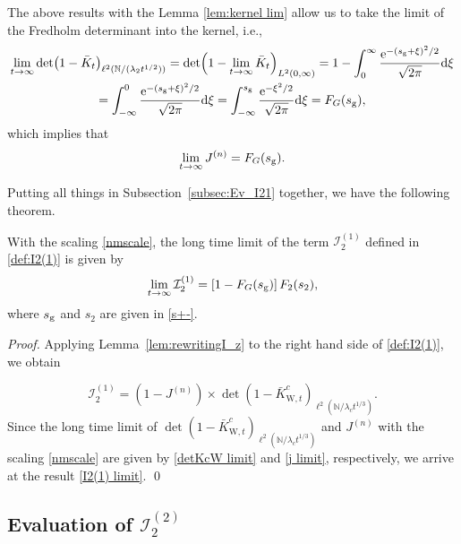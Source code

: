 \documentclass[cmp]{svjour}
\numberwithin{theorem}{section}
\numberwithin{equation}{section}
\DeclareMathOperator{\e}{e}
\def\dd{{\rm d}}
\begin{document}
The above results with the Lemma \ref{lem:kernel lim} allow us to take the limit of the Fredholm determinant into the kernel, i.e.,
\begin{multline*}
\lim_{t\rightarrow\infty}\det(1-\bar{K}_t)_{\ell^2(\mathbb{N}/(\lambda_2 t^{1/2}))}
=\det(1-\lim_{t\rightarrow\infty} \bar{K}_t)_{L^2(0,\infty)}
=1-\int_{0}^{\infty}\frac{\e^{-(s_{\rm g}+\xi)^2/2}}{\sqrt{2\pi}}\dd \xi\\=
\int^{0}_{-\infty}\frac{\e^{-(s_{\rm g}+\xi)^2/2}}{\sqrt{2\pi}}\dd \xi
=
\int^{s_{\rm g}}_{-\infty}\frac{\e^{-\xi^2/2}}{\sqrt{2\pi}}\dd \xi
=F_G(s_{\rm g}),
\end{multline*}
which implies that
\begin{equation}\label{j limit}
\lim_{t\rightarrow \infty} J^{(n)} =F_G(s_{\rm g}) .
\end{equation}

Putting all things in Subsection~\ref{subsec:Ev_I21} together, we have the following theorem.

\begin{theorem}
\label{thm_I2(1) limit}
With the scaling  \eqref{nmscale}, the long time limit of the term $\mathcal{I}^{(1)}_2$ defined in \eqref{def:I2(1)} is given by 
\begin{equation}
\label{I2(1) limit}
\lim_{t\rightarrow\infty}\mathcal{I}^{(1)}_2 = \left[ 1 - F_G(s_{\rm g}) \right] F_2(s_2),
\end{equation}
where $s_{\rm g}$ and $s_{2}$ are given in \eqref{s+-}.

\end{theorem}

\begin{proof}
Applying Lemma~\ref{lem:rewritingI_z} to the right hand side of \eqref{def:I2(1)}, we obtain

\begin{equation*}
    \mathcal{I}^{(1)}_2 = (1 - J^{(n)}) \times \det(1 - \bar{K}^c_{\mathrm{W},t})_{\ell^2(\mathbb{N}/\lambda_c t^{1/3})}.
\end{equation*}
Since the long time limit of $\det(1-\bar{K}^c_{\mathrm{W},t})_{\ell^2(\mathbb{N}/\lambda_c t^{1/3})}$ and $J^{(n)}$ with the scaling \eqref{nmscale} are given by \eqref{detKcW limit} and \eqref{j limit}, respectively, we arrive at the result \eqref{I2(1) limit}. \qed

\end{proof}

\subsection{Evaluation of $\mathcal{I}^{(2)}_2$}
\label{subsec:Ev_I22}
\end{document}

